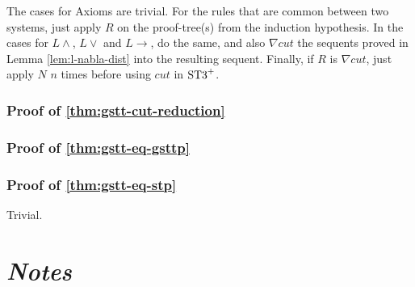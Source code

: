 \documentclass[a4paper, 12pt]{paper}
\begin{document}
The cases for Axioms are trivial.
For the rules that are common between two systems, just apply $R$ on the proof-tree(s) from the induction hypothesis.
In the cases for $L \wedge$, $L \vee$ and $L \rightarrow$, do the same, and also $\nabla cut$ the sequents proved in Lemma \ref{lem:l-nabla-dist} into the resulting sequent. Finally, if $R$ is $\nabla cut$, just apply $N$ $n$ times before using $cut$ in $\text{ST3}^+$.



\section{Proof of \ref{thm:gstt-cut-reduction}}\label{pr:gstt-cut-reduction}




\section{Proof of \ref{thm:gstt-eq-gsttp}}\label{pr:gstt-eq-gsttp}




\section{Proof of \ref{thm:gstt-eq-stp}}\label{pr:gstt-eq-stp}
Trivial.



\pagebreak

\part*{\emph{Notes}}
\end{document}
